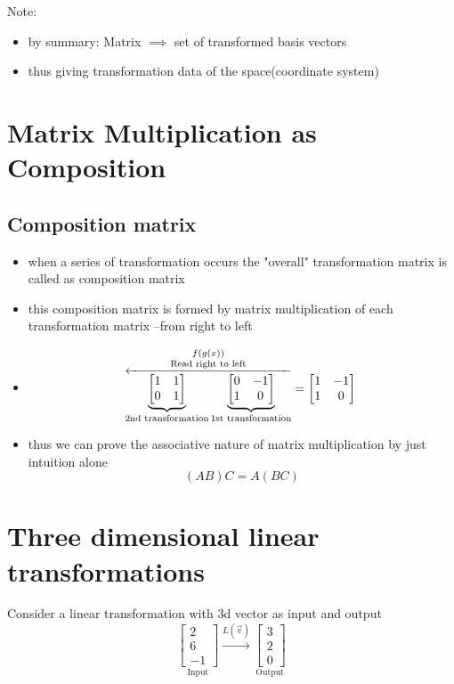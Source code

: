 \documentclass[a4paper]{article}
\begin{document}
Note:
\begin{itemize}
	\item by summary: Matrix $\implies$ set of transformed basis vectors
	\item thus giving transformation data of the
	      space(coordinate system)
\end{itemize}


\newpage
\section{Matrix Multiplication as Composition}

\subsection{Composition matrix}
\begin{itemize}
	\item when a series of transformation occurs the
	      "overall" transformation matrix is called
	      as composition matrix
	\item this composition matrix is formed by matrix
	      multiplication of each transformation matrix
	      --from right to left
	\item \[
		      \overset{f(g(x))}{
		      \overset{\text{Read right to left}}{
		      \overleftarrow{
		      \underbrace{\begin{bmatrix} 1 & 1 \\ 0 & 1 \end{bmatrix}}
		      _{\text{2nd transformation}}
		      \underbrace{\begin{bmatrix} 0 & -1 \\ 1 & 0\end{bmatrix}}
		      _{\text{1st transformation}}
		      }
		      }
		      }
		      = \begin{bmatrix} 1 & -1 \\ 1 & 0\end{bmatrix} \\
	      \]
	\item thus we can prove the associative nature of
	      matrix multiplication by just intuition alone
	      \[
		      (AB)C = A(BC)
	      \]
\end{itemize}

\newpage
\section{Three dimensional linear transformations}
Consider a linear transformation with 3d vector as input
and output
\[
	\underset{\text{Input}}{
		\begin{bmatrix} 2 \\ 6 \\ -1 \end{bmatrix}
	}
	\xrightarrow{L (\vec{v})}
	\underset{\text{Output}}{
		\begin{bmatrix} 3 \\ 2 \\ 0 \end{bmatrix}
	}
\]
\end{document}
